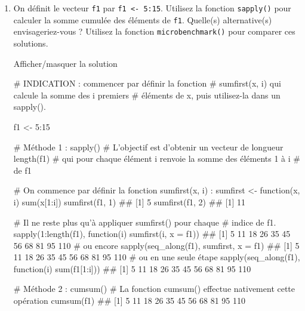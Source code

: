 \documentclass[12pt,]{article}
\newenvironment{Shaded}{}{}
\newcommand{\KeywordTok}[1]{\textcolor[rgb]{0.00,0.00,1.00}{{#1}}}
\newcommand{\DataTypeTok}[1]{{#1}}
\newcommand{\DecValTok}[1]{{#1}}
\newcommand{\StringTok}[1]{\textcolor[rgb]{0.00,0.50,0.50}{{#1}}}
\newcommand{\CommentTok}[1]{\textcolor[rgb]{0.00,0.50,0.00}{{#1}}}
\newcommand{\NormalTok}[1]{{#1}}
\begin{document}
\begin{enumerate}
\def\labelenumi{\alph{enumi}.}
\item
  On définit le vecteur \texttt{f1} par \texttt{f1\ \textless{}-\ 5:15}.
  Utilisez la fonction \texttt{sapply()} pour calculer la somme cumulée
  des éléments de \texttt{f1}. Quelle(s) alternative(s)
  envisageriez-vous ? Utilisez la fonction \texttt{microbenchmark()}
  pour comparer ces solutions.

  Afficher/masquer la solution

  \hypertarget{sol23}{}
\begin{Shaded}
\begin{Highlighting}[]
\CommentTok{# INDICATION : commencer par définir la fonction }
\CommentTok{# sumfirst(x, i) qui calcule la somme des i premiers }
\CommentTok{# éléments de x, puis utilisez-la dans un sapply(). }

\NormalTok{f1 <-}\StringTok{ }\DecValTok{5}\NormalTok{:}\DecValTok{15}

\CommentTok{# Méthode 1 : sapply()}
\CommentTok{# L'objectif est d'obtenir un vecteur de longueur length(f1)}
\CommentTok{# qui pour chaque élément i renvoie la somme des éléments 1 à i}
\CommentTok{# de f1}

\CommentTok{# On commence par définir la fonction sumfirst(x, i) : }
\NormalTok{sumfirst <-}\StringTok{ }\NormalTok{function(x, i) }\KeywordTok{sum}\NormalTok{(x[}\DecValTok{1}\NormalTok{:i])}
\KeywordTok{sumfirst}\NormalTok{(f1, }\DecValTok{1}\NormalTok{)}
\NormalTok{## [1] 5}
\KeywordTok{sumfirst}\NormalTok{(f1, }\DecValTok{2}\NormalTok{)}
\NormalTok{## [1] 11}

\CommentTok{# Il ne reste plus qu'à appliquer sumfirst() pour chaque}
\CommentTok{# indice de f1.}
\KeywordTok{sapply}\NormalTok{(}\DecValTok{1}\NormalTok{:}\KeywordTok{length}\NormalTok{(f1), function(i) }\KeywordTok{sumfirst}\NormalTok{(i, }\DataTypeTok{x =} \NormalTok{f1))}
\NormalTok{##  [1]   5  11  18  26  35  45  56  68  81  95 110}
\CommentTok{# ou encore}
\KeywordTok{sapply}\NormalTok{(}\KeywordTok{seq_along}\NormalTok{(f1), sumfirst, }\DataTypeTok{x =} \NormalTok{f1)}
\NormalTok{##  [1]   5  11  18  26  35  45  56  68  81  95 110}
\CommentTok{# ou en une seule étape}
\KeywordTok{sapply}\NormalTok{(}\KeywordTok{seq_along}\NormalTok{(f1), function(i) }\KeywordTok{sum}\NormalTok{(f1[}\DecValTok{1}\NormalTok{:i]))}
\NormalTok{##  [1]   5  11  18  26  35  45  56  68  81  95 110}

\CommentTok{# Méthode 2 : cumsum()}
\CommentTok{# La fonction cumsum() effectue nativement cette opération}
\KeywordTok{cumsum}\NormalTok{(f1)}
\NormalTok{##  [1]   5  11  18  26  35  45  56  68  81  95 110}


\end{Highlighting}
\end{Shaded}
\end{enumerate}
\end{document}
